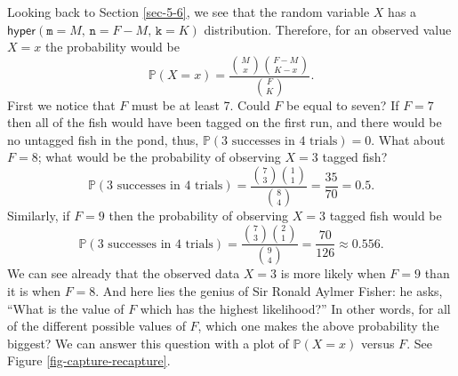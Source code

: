 \documentclass[captions=tableheading]{scrbook}
\begin{document}
\begin{example}
Looking back to Section \ref{sec-5-6}, we see that the random variable \(X\) has a \(\mathsf{hyper}(\mathtt{m}=M,\,\mathtt{n}=F-M,\,\mathtt{k}=K)\) distribution. Therefore, for an observed value \(X=x\) the probability would be
\[
\mathbb{P}(X=x)=\frac{{M \choose x}{F-M \choose K-x}}{{F \choose K}}.
\]
First we notice that \(F\) must be at least 7. Could \(F\) be equal to seven? If \(F=7\) then all of the fish would have been tagged on the first run, and there would be no untagged fish in the pond, thus, \(\mathbb{P}(\mbox{3 successes in 4 trials})=0\). 
What about \(F=8\); what would be the probability of observing \(X=3\) tagged fish?
\[
\mathbb{P}(\mbox{3 successes in 4 trials})=\frac{{7 \choose 3}{1 \choose 1}}{{8 \choose 4}}=\frac{35}{70}=0.5.
\]
Similarly, if \(F=9\) then the probability of observing \(X=3\) tagged fish would be
\[
\mathbb{P}(\mbox{3 successes in 4 trials})=\frac{{7 \choose 3}{2 \choose 1}}{{9 \choose 4}}=\frac{70}{126}\approx0.556.
\]
We can see already that the observed data \(X=3\) is more likely when \(F=9\) than it is when \(F=8\). And here lies the genius of Sir Ronald Aylmer Fisher: he asks, ``What is the value of \(F\) which has the highest likelihood?'' In other words, for all of the different possible values of \(F\), which one makes the above probability the biggest? We can answer this question with a plot of \(\mathbb{P}(X=x)\) versus \(F\). See Figure \ref{fig-capture-recapture}.
\end{example}
\end{document}
